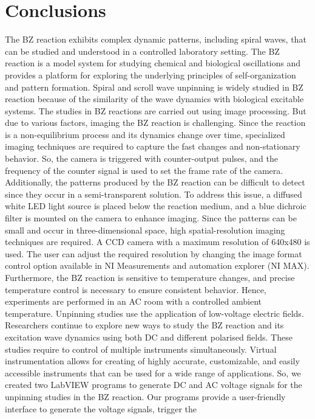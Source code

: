 \documentclass[journal=jacsat,manuscript=article]{achemso}
\begin{document}
\section{Conclusions} 
The BZ reaction exhibits complex dynamic patterns, including spiral
waves, that can be studied and understood in a controlled laboratory
setting. The BZ reaction is a model system for studying chemical and
biological oscillations and provides a platform for exploring the
underlying principles of self-organization and pattern
formation. Spiral and scroll wave unpinning is widely studied in BZ
reaction because of the similarity of the wave dynamics with
biological excitable systems.  The studies in BZ reactions are carried
out using image processing. But due to various factors, imaging the BZ
reaction is challenging. Since the reaction is a non-equilibrium
process and its dynamics change over time, specialized imaging
techniques are required to capture the fast changes and non-stationary
behavior. So, the camera is triggered with counter-output pulses, and
the frequency of the counter signal is used to set the frame rate of
the camera. Additionally, the patterns produced by the BZ reaction can
be difficult to detect since they occur in a semi-transparent
solution. To address this issue, a diffused white LED light source is
placed below the reaction medium, and a blue dichroic filter is
mounted on the camera to enhance imaging. Since the patterns can be
small and occur in three-dimensional space, high spatial-resolution
imaging techniques are required. A CCD camera with a maximum
resolution of 640x480 is used. The user can adjust the required
resolution by changing the image format control option available in NI
Measurements and automation explorer (NI MAX). Furthermore, the BZ
reaction is sensitive to temperature changes, and precise temperature
control is necessary to ensure consistent behavior. Hence, experiments
are performed in an AC room with a controlled ambient temperature.
Unpinning studies use the application of low-voltage electric
fields. Researchers continue to explore new ways to study the BZ
reaction and its excitation wave dynamics using both DC and different
polarised fields. These studies require to control of multiple
instruments simultaneously. Virtual instrumentation allows for
creating of highly accurate, customizable, and easily accessible
instruments that can be used for a wide range of applications. So, we
created two LabVIEW programs to generate DC and AC voltage signals for
the unpinning studies in the BZ reaction. Our programs provide a
user-friendly interface to generate the voltage signals, trigger the
\end{document}
